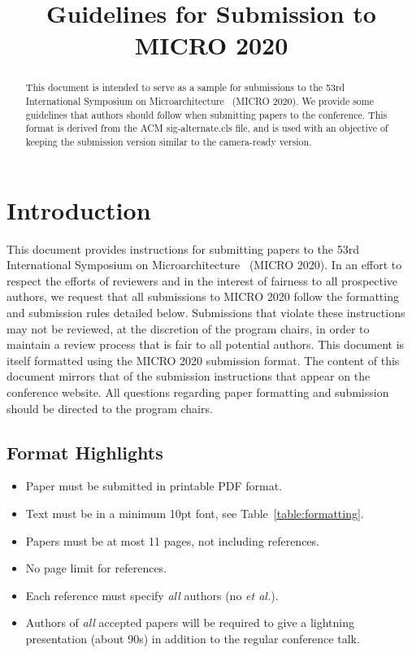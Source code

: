 \documentclass{sig-alternate}
\title{Guidelines for Submission to MICRO 2020}
\begin{document}
\maketitle
\thispagestyle{firstpage}
\pagestyle{plain}




\begin{abstract}

    This document is intended to serve as a sample for submissions to the 53rd International Symposium on Microarchitecture~{\textregistered} (MICRO 2020). We provide some guidelines that authors should follow when submitting papers to the conference.  This format is derived from the ACM sig-alternate.cls file, and is used with an objective of keeping the submission version similar to the camera-ready version.

\end{abstract}

\section{Introduction}

This document provides instructions for submitting papers to the 53rd International Symposium on Microarchitecture~{\textregistered} (MICRO 2020).  In an effort to respect the efforts of reviewers and in the interest of fairness to all prospective authors, we request that all submissions to MICRO 2020 follow the formatting and submission rules detailed below. Submissions that violate these instructions may not be reviewed, at the discretion of the program chairs, in order to maintain a review process that is fair to all potential authors. This document is itself formatted using the MICRO 2020 submission format. The content of this document mirrors that of the submission instructions that appear on the conference website. All questions regarding paper formatting and submission should be directed to the program chairs.

\subsection{Format Highlights}
\begin{itemize}
\item Paper must be submitted in printable PDF format.
\item Text must be in a minimum 10pt font, see Table~\ref{table:formatting}.
\item Papers must be at most 11 pages, not including references.
\item No page limit for references.
\item Each reference must specify {\em all} authors (no {\em et al.}).
\item Authors of {\em all} accepted papers will be required to give a
lightning presentation (about 90s) in addition to the regular
conference talk.
\end{itemize}
\end{document}
